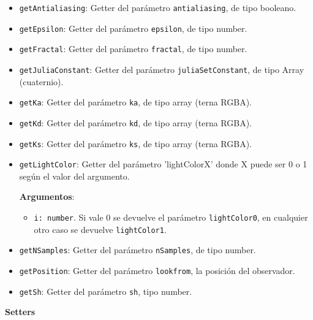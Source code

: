 \begin{itemize}
    \item \verb|getAntialiasing|: Getter del parámetro \verb|antialiasing|, de tipo booleano.
    \item \verb|getEpsilon|: Getter del parámetro \verb|epsilon|, de tipo number.
    \item \verb|getFractal|: Getter del parámetro \verb|fractal|, de tipo number.
    \item \verb|getJuliaConstant|: Getter del parámetro \verb|juliaSetConstant|, de tipo Array (cuaternio).
    \item \verb|getKa|: Getter del parámetro \verb|ka|, de tipo array (terna RGBA).
    \item \verb|getKd|: Getter del parámetro \verb|kd|, de tipo array (terna RGBA).
    \item \verb|getKs|: Getter del parámetro \verb|ks|, de tipo array (terna RGBA).
    \item \verb|getLightColor|: Getter del parámetro 'lightColorX' donde X puede ser 0 o 1 según el valor del argumento.
    
    \textbf{Argumentos}:
    \begin{itemize}
        \item \verb|i: number|. Si vale 0 se devuelve el parámetro \verb|lightColor0|, en cualquier otro caso se devuelve \verb|lightColor1|.
    \end{itemize}
    \item \verb|getNSamples|: Getter del parámetro \verb|nSamples|, de tipo number.
    \item \verb|getPosition|: Getter del parámetro \verb|lookfrom|, la posición del observador.
    \item \verb|getSh|: Getter del parámetro \verb|sh|, tipo number.
\end{itemize}
\textbf{Setters}
